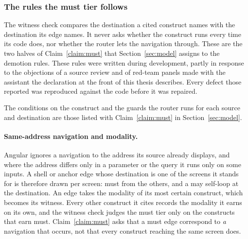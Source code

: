 \begin{table}[t]\small
\caption{Final-snapshot witness-check outcomes and must conversion.
The must column counts edges whose destination was read and passed; the rest are unread
destinations, neither passes nor failures, and no must edge failed.
``Not applicable'' means the application emits no must edge. \emph{Sites cited} counts the source
locations the edges cite, \emph{Judged} counts those less the over-approximated and unread ones, and
\emph{Clean of judged} is the share of judged locations whose construct names the edge's destination.}
\label{tab:round2sound}
\TabRoundTwoSoundness
\end{table}

\subsubsection{The rules the must tier follows}

The witness check compares the destination a cited construct names with the destination its edge
names. It never asks whether the construct runs every time its code does, nor whether the router lets
the navigation through. These are the two halves of Claim~\ref{claim:must} that
Section~\ref{sec:model} assigns to the demotion rules. These rules were written during development, partly in response to
the objections of a source review and of red-team panels made with the assistant the declaration at
the front of this thesis describes. Every defect those reported was reproduced against the code
before it was repaired.

The conditions on the construct and the guards the router runs for each source and destination are those
listed with Claim~\ref{claim:must} in Section~\ref{sec:model}.

\paragraph{Same-address navigation and modality.} Angular ignores a navigation to the address its
source already displays, and where the address differs only in a parameter or the query it runs only
on some inputs. A shell or anchor edge whose destination is one of the screens it stands for is
therefore drawn per screen: must from the others, and a may self-loop at the destination. An edge
takes the modality of its most certain construct, which becomes its witness. Every other construct it
cites records the modality it earns on its own, and the witness check judges the must tier only on
the constructs that earn must. Claim~\ref{claim:must} asks that a must edge correspond to \emph{a}
navigation that occurs, not that every construct reaching the same screen does.

